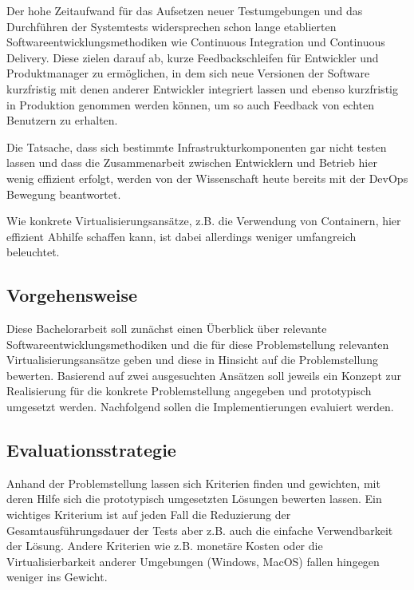 Der hohe Zeitaufwand für das Aufsetzen neuer Testumgebungen und das Durchführen der Systemtests widersprechen schon lange etablierten Softwareentwicklungsmethodiken wie Continuous Integration und Continuous Delivery. Diese zielen darauf ab, kurze Feedbackschleifen für Entwickler und Produktmanager zu ermöglichen, in dem sich neue Versionen der Software kurzfristig mit denen anderer Entwickler integriert lassen und ebenso kurzfristig in Produktion genommen werden können, um so auch Feedback von echten Benutzern zu erhalten.

Die Tatsache, dass sich bestimmte Infrastrukturkomponenten gar nicht testen lassen und dass die Zusammenarbeit zwischen Entwicklern und Betrieb hier wenig effizient erfolgt, werden von der Wissenschaft heute bereits mit der DevOps Bewegung beantwortet.

Wie konkrete Virtualisierungsansätze, z.B. die Verwendung von Containern, hier effizient Abhilfe schaffen kann, ist dabei allerdings weniger umfangreich beleuchtet.

\subsection{Vorgehensweise}

Diese Bachelorarbeit soll zunächst einen Überblick über relevante Softwareentwicklungsmethodiken und die für diese Problemstellung relevanten Virtualisierungsansätze geben und diese in Hinsicht auf die Problemstellung bewerten. Basierend auf zwei ausgesuchten Ansätzen soll jeweils ein Konzept zur Realisierung für die konkrete Problemstellung angegeben und prototypisch umgesetzt werden. Nachfolgend sollen die Implementierungen evaluiert werden.

\subsection{Evaluationsstrategie}

Anhand der Problemstellung lassen sich Kriterien finden und gewichten, mit deren Hilfe sich die prototypisch umgesetzten Lösungen bewerten lassen. Ein wichtiges Kriterium ist auf jeden Fall die Reduzierung der Gesamtausführungsdauer der Tests aber z.B. auch die einfache Verwendbarkeit der Lösung. Andere Kriterien wie z.B. monetäre Kosten oder die Virtualisierbarkeit anderer Umgebungen (Windows, MacOS) fallen hingegen weniger ins Gewicht.